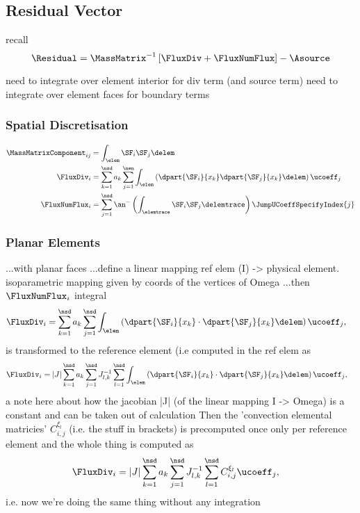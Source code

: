 \subsection{Residual Vector}
recall
$$
\Residual = \MassMatrix^{-1} \left[  \FluxDiv + \FluxNumFlux \right] - \Asource
$$

need to integrate over element interior for div term (and source term)
need to integrate over element faces for boundary terms


\subsubsection{Spatial Discretisation}
  
\begin{align*}
\MassMatrixComponent_{ij} &= \int_{\elem} \SF_i \SF_j \delem \\
\FluxDiv_{i} &=  \sum_{k=1}^{\nsd} a_k \sum_{j=1}^{\nen} \int_{\elem} \left( \dpart{\SF_i}{x_k} \dpart{\SF_j}{x_k} \delem \right) \ucoeff_j \\
\FluxNumFlux_{i} &= \sum_{j=1}^{\nsd} \an^{-}
\left( 
\int_{\elemtrace} \SF_i \SF_j
  \delemtrace
 \right)
\JumpUCoeffSpecifyIndex{j} \\
\end{align*}
\subsubsection{Planar Elements}

...with planar faces
...define a linear mapping ref elem (I) -> physical element.
isoparametric mapping given by coords of the vertices of Omega
...then $\FluxNumFlux_{i}$ integral 
\begin{align*}
\FluxDiv_{i} &=  \sum_{k=1}^{\nsd} a_k \sum_{j=1}^{\nsd} \int_{\elem} \left( \dpart{\SF_i}{x_k} \cdot \dpart{\SF_j}{x_k} \delem \right) \ucoeff_j ,
\end{align*}
is transformed to the reference element (i.e computed in the ref elem as
\begin{align*}
\FluxDiv_{i} &= |J| \sum_{k=1}^{\nsd} a_k \sum_{j=1}^{\nsd} J_{l,k}^{-1} \sum_{l=1}^{\nsd}\int_{\elem} \left( \dpart{\SF_i}{x_k} \cdot \dpart{\SF_j}{x_k} \delem \right) \ucoeff_j ,
\end{align*}
a note here about how the jacobian |J| (of the linear mapping I -> Omega) is a constant
and can be taken out of calculation
Then the 'convection elemental matricies' $ C_{i,j}^{\xi_l} $ (i.e. the stuff in brackets) is
precomputed once only per reference element
and the whole thing is computed as
\begin{align*}
\FluxDiv_{i} &= |J| \sum_{k=1}^{\nsd} a_k \sum_{j=1}^{\nsd} J_{l,k}^{-1} \sum_{l=1}^{\nsd} C_{i,j}^{\xi_l} \ucoeff_j ,
\end{align*}
i.e. now we're doing the same thing without any integration

